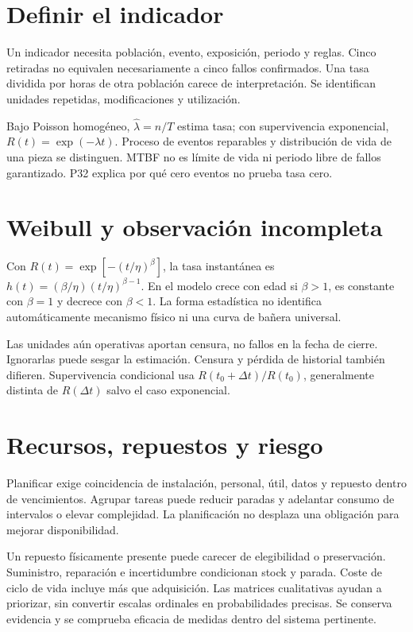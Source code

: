 
\section{Definir el indicador}
Un indicador necesita población, evento, exposición, periodo y reglas. Cinco retiradas no equivalen necesariamente a cinco fallos confirmados. Una tasa dividida por horas de otra población carece de interpretación. Se identifican unidades repetidas, modificaciones y utilización.

Bajo Poisson homogéneo, $\widehat\lambda=n/T$ estima tasa; con supervivencia exponencial, $R(t)=\exp(-\lambda t)$. Proceso de eventos reparables y distribución de vida de una pieza se distinguen. MTBF no es límite de vida ni periodo libre de fallos garantizado. P32 explica por qué cero eventos no prueba tasa cero.
\section{Weibull y observación incompleta}
Con $R(t)=\exp[-(t/\eta)^\beta]$, la tasa instantánea es $h(t)=(\beta/\eta)(t/\eta)^{\beta-1}$. En el modelo crece con edad si $\beta>1$, es constante con $\beta=1$ y decrece con $\beta<1$. La forma estadística no identifica automáticamente mecanismo físico ni una curva de bañera universal.

Las unidades aún operativas aportan censura, no fallos en la fecha de cierre. Ignorarlas puede sesgar la estimación. Censura y pérdida de historial también difieren. Supervivencia condicional usa $R(t_0+\Delta t)/R(t_0)$, generalmente distinta de $R(\Delta t)$ salvo el caso exponencial.
\section{Recursos, repuestos y riesgo}
Planificar exige coincidencia de instalación, personal, útil, datos y repuesto dentro de vencimientos. Agrupar tareas puede reducir paradas y adelantar consumo de intervalos o elevar complejidad. La planificación no desplaza una obligación para mejorar disponibilidad.

Un repuesto físicamente presente puede carecer de elegibilidad o preservación. Suministro, reparación e incertidumbre condicionan stock y parada. Coste de ciclo de vida incluye más que adquisición. Las matrices cualitativas ayudan a priorizar, sin convertir escalas ordinales en probabilidades precisas. Se conserva evidencia y se comprueba eficacia de medidas dentro del sistema pertinente.
